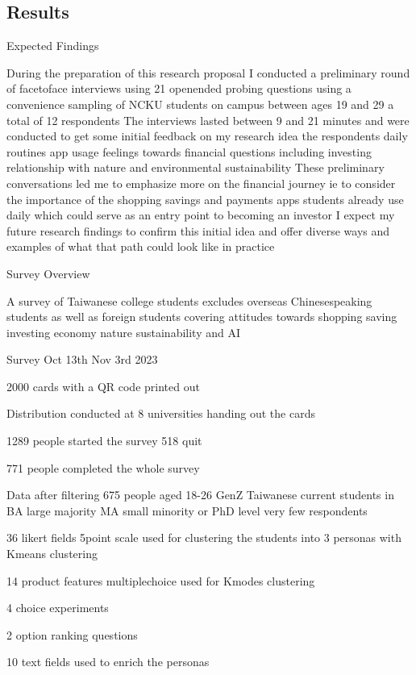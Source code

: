 \documentclass[
  letterpaper,
  DIV=11,
  numbers=noendperiod]{scrartcl}
\begin{document}
\newpage

\subsection{Results}\label{results}

Expected Findings

During the preparation of this research proposal I conducted a
preliminary round of facetoface interviews using 21 openended probing
questions using a convenience sampling of NCKU students on campus
between ages 19 and 29 a total of 12 respondents The interviews lasted
between 9 and 21 minutes and were conducted to get some initial feedback
on my research idea the respondents daily routines app usage feelings
towards financial questions including investing relationship with nature
and environmental sustainability These preliminary conversations led me
to emphasize more on the financial journey ie to consider the importance
of the shopping savings and payments apps students already use daily
which could serve as an entry point to becoming an investor I expect my
future research findings to confirm this initial idea and offer diverse
ways and examples of what that path could look like in practice

Survey Overview

A survey of Taiwanese college students excludes overseas Chinesespeaking
students as well as foreign students covering attitudes towards shopping
saving investing economy nature sustainability and AI

Survey Oct 13th Nov 3rd 2023

2000 cards with a QR code printed out

Distribution conducted at 8 universities handing out the cards

1289 people started the survey 518 quit

771 people completed the whole survey

Data after filtering 675 people aged 18-26 GenZ Taiwanese current
students in BA large majority MA small minority or PhD level very few
respondents

36 likert fields 5point scale used for clustering the students into 3
personas with Kmeans clustering

14 product features multiplechoice used for Kmodes clustering

4 choice experiments

2 option ranking questions

10 text fields used to enrich the personas
\end{document}
